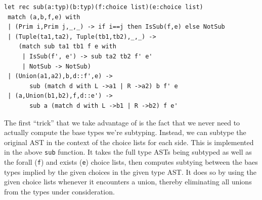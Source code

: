 \documentclass[a4paper,english]{lipics-v2019}
\begin{document}
\begin{lstlisting}
let rec sub(a:typ)(b:typ)(f:choice list)(e:choice list)
 match (a,b,f,e) with
 | (Prim i,Prim j,_,_) -> if i==j then IsSub(f,e) else NotSub
 | (Tuple(ta1,ta2), Tuple(tb1,tb2),_,_) ->
    (match sub ta1 tb1 f e with
     | IsSub(f', e') -> sub ta2 tb2 f' e'
     | NotSub -> NotSub)
 | (Union(a1,a2),b,d::f',e) -> 
       sub (match d with L ->a1 | R ->a2) b f' e
 | (a,Union(b1,b2),f,d::e') -> 
       sub a (match d with L ->b1 | R ->b2) f e'
\end{lstlisting}

The first ``trick'' that we take advantage of is the fact that we never need
to actually compute the base types we're subtyping. Instead, we can subtype
the original AST in the context of the choice lists for each side. This is
implemented in the above \lstinline{sub} function. It takes the full type ASTs
being subtyped as well as the forall (\lstinline{f}) and exists
(\lstinline{e}) choice lists, then computes subtying between the baes types 
implied by the given choices in the given type AST. It does so by using the 
given choice lists whenever it encounters a union, thereby eliminating all
unions from the types under consideration.
\end{document}
